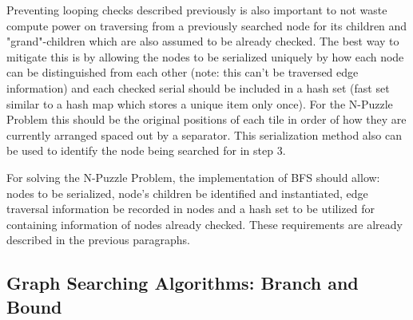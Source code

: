 \par Preventing looping checks described previously is also important to not waste compute power on traversing from a previously searched node for its children and "grand"-children which are also assumed to be already checked. The best way to mitigate this is by allowing the nodes to be serialized uniquely by how each node can be distinguished from each other (note: this can't be traversed edge information) and each checked serial should be included in a hash set (fast set similar to a hash map which stores a unique item only once). For the N-Puzzle Problem this should be the original positions of each tile in order of how they are currently arranged spaced out by a separator. This serialization method also can be used to identify the node being searched for in step 3.

\par For solving the N-Puzzle Problem, the implementation of BFS should allow: nodes to be serialized, node's children be identified and instantiated, edge traversal information be recorded in nodes and a hash set to be utilized for containing information of nodes already checked. These requirements are already described in the previous paragraphs.

\subsection{Graph Searching Algorithms: Branch and Bound}
